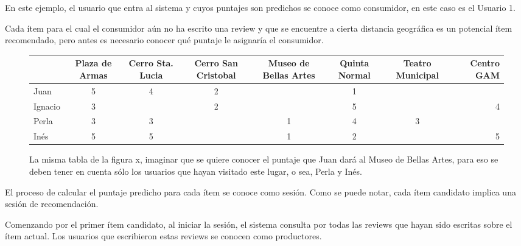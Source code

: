 En este ejemplo, el usuario que entra al sistema y cuyos puntajes son predichos se conoce como consumidor, en este caso es el Usuario 1.

Cada ítem para el cual el consumidor aún no ha escrito una review y que se encuentre a cierta distancia geográfica es un potencial ítem recomendado, pero antes es necesario conocer qué puntaje le asignaría el consumidor.

\begin{figure}
\centering
\begin{adjustbox}{max width=\textwidth}
\begin{tabular}{l*{6}{c}r}
                  & Plaza de Armas & Cerro Sta. Lucia & Cerro San Cristobal & Museo de Bellas Artes & Quinta Normal  & Teatro Municipal & Centro GAM \\
\hline
\rowcolor{yellow} Juan          & 5 & 4 & 2 &   & 1 &   &   \\
\hline
Ignacio       & 3 &   & 2 &   & 5 &   & 4 \\
\hline
\rowcolor{yellow}Perla         & 3 & 3 &   & 1 & 4 & 3 &   \\
\hline
\rowcolor{yellow}Inés          & 5 & 5 &   & 1 & 2 &   & 5 \\


\end{tabular}
\end{adjustbox}
\caption{La misma tabla de la figura x, imaginar que se quiere conocer el puntaje que Juan dará al Museo de Bellas Artes, para eso se deben tener en cuenta sólo los usuarios que hayan visitado este lugar, o sea, Perla y Inés.}

\end{figure}

El proceso de calcular el puntaje predicho para cada ítem se conoce como sesión. Como se puede notar, cada ítem candidato implica una sesión de recomendación.

Comenzando por el primer ítem candidato, al iniciar la sesión, el sistema consulta por todas las reviews que hayan sido escritas sobre el ítem actual. Los usuarios que escribieron estas reviews se conocen como productores.

